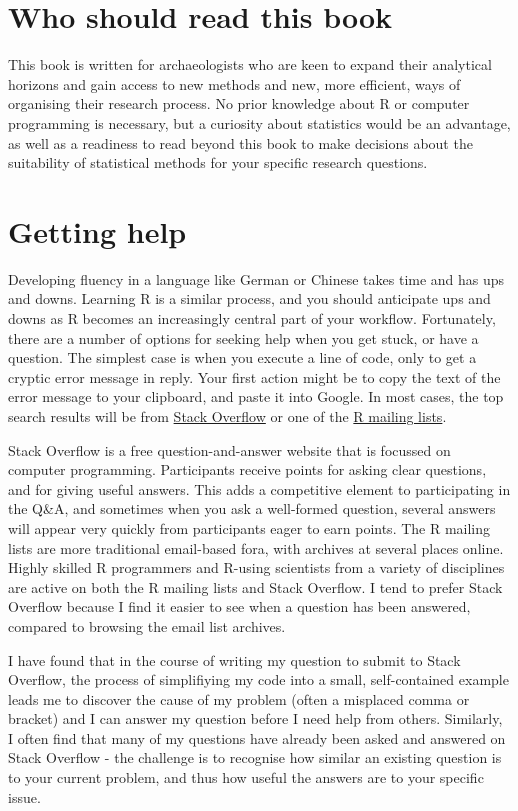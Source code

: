 \section{Who should read this book}

This book is written for archaeologists who are keen to expand their
analytical horizons and gain access to new methods and new, more
efficient, ways of organising their research process. No prior knowledge
about R or computer programming is necessary, but a curiosity about
statistics would be an advantage, as well as a readiness to read beyond
this book to make decisions about the suitability of statistical methods
for your specific research questions.

\section{Getting help}

Developing fluency in a language like German or Chinese takes time and
has ups and downs. Learning R is a similar process, and you should
anticipate ups and downs as R becomes an increasingly central part of
your workflow. Fortunately, there are a number of options for seeking
help when you get stuck, or have a question. The simplest case is when
you execute a line of code, only to get a cryptic error message in
reply. Your first action might be to copy the text of the error message
to your clipboard, and paste it into Google. In most cases, the top
search results will be from \href{http://stackoverflow.com/}{Stack
Overflow} or one of the \href{https://www.r-project.org/mail.html}{R
mailing lists}.

Stack Overflow is a free question-and-answer website that is focussed on
computer programming. Participants receive points for asking clear
questions, and for giving useful answers. This adds a competitive
element to participating in the Q\&A, and sometimes when you ask a
well-formed question, several answers will appear very quickly from
participants eager to earn points. The R mailing lists are more
traditional email-based fora, with archives at several places online.
Highly skilled R programmers and R-using scientists from a variety of
disciplines are active on both the R mailing lists and Stack Overflow. I
tend to prefer Stack Overflow because I find it easier to see when a
question has been answered, compared to browsing the email list
archives.

I have found that in the course of writing my question to submit to
Stack Overflow, the process of simplifiying my code into a small,
self-contained example leads me to discover the cause of my problem
(often a misplaced comma or bracket) and I can answer my question before
I need help from others. Similarly, I often find that many of my
questions have already been asked and answered on Stack Overflow - the
challenge is to recognise how similar an existing question is to your
current problem, and thus how useful the answers are to your specific
issue.

